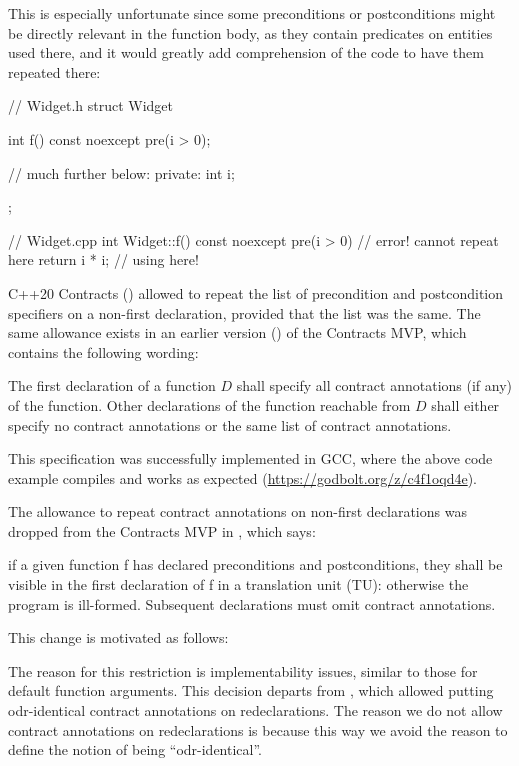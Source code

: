 This is especially unfortunate since some preconditions or postconditions might be directly relevant in the function body, as they contain predicates on entities used there, and it would greatly add comprehension of the code to have them repeated there:

\begin{codeblock}
// Widget.h
struct Widget
{
  int f() const noexcept pre(i > 0);
  
  // much further below:
private:
  int i;
};

// Widget.cpp
int Widget::f() const noexcept pre(i > 0)  // error! cannot repeat  here
{
  return i * i; // using  here!
}
\end{codeblock}

\pagebreak %

C++20 Contracts (\cite{P0542R5}) allowed to repeat the list of precondition and postcondition specifiers on a non-first declaration, provided that the list was the same. The same allowance exists in an earlier version (\cite{P2388R4}) of the Contracts MVP, which contains the following wording:

\begin{adjustwidth}{0.5cm}{0.5cm}
The first declaration of a function $D$ shall specify all contract annotations (if any) of the function. Other declarations of the function reachable from $D$ shall either specify no contract annotations or the same list of contract annotations.
\end{adjustwidth}

This specification was successfully implemented in GCC, where the above code example compiles and works as expected (\href{https://godbolt.org/z/c4f1oqd4e}{https://godbolt.org/z/c4f1oqd4e}).

The allowance to repeat contract annotations on non-first declarations was dropped from the Contracts MVP in \cite{P2521R5}, which says:
\begin{adjustwidth}{0.5cm}{0.5cm}
if a given function f has declared preconditions and postconditions, they shall be visible in the first declaration of f in a translation unit (TU): otherwise the program is ill-formed. Subsequent declarations must omit contract annotations.
\end{adjustwidth}

This change is motivated as follows:
\begin{adjustwidth}{0.5cm}{0.5cm}
The reason for this restriction is implementability issues, similar to those for default function arguments. This decision departs from \cite{P0542R5}, which allowed putting odr-identical contract annotations on redeclarations. The reason we do not allow contract annotations on redeclarations is because this way we avoid the reason to define the notion of being ``odr-identical''.
\end{adjustwidth}

